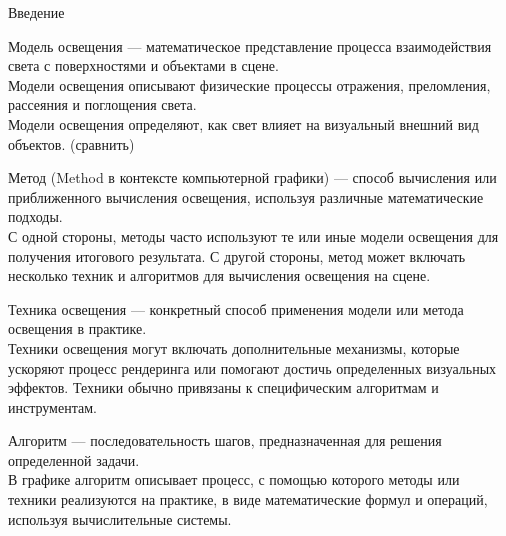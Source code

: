 \documentclass{beamer}
\begin{document}
	\begin{frame}{Введение}
	
		Модель освещения --- математическое представление процесса взаимодействия света с поверхностями и объектами в сцене.\\
		{\footnotesize
		Модели освещения описывают физические процессы отражения, преломления, рассеяния и поглощения света.\\
		Модели освещения определяют, как свет влияет на визуальный внешний вид объектов. (сравнить)
		}

		\vspace{0.15cm}

		Метод (Method в контексте компьютерной графики) --- способ вычисления или приближенного вычисления освещения, используя различные математические подходы.\\
		{\footnotesize
		С одной стороны, методы часто используют те или иные модели освещения для получения итогового результата. 
		С другой стороны, метод может включать несколько техник и алгоритмов для вычисления освещения на сцене.
		}
		
		\vspace{0.15cm}
		Техника освещения --- конкретный способ применения модели или метода освещения в практике. \\
		{\footnotesize
		Техники освещения могут включать дополнительные механизмы, которые ускоряют процесс рендеринга или помогают достичь определенных визуальных эффектов. 
		Техники обычно привязаны к специфическим алгоритмам и инструментам.
		}
		
		\vspace{0.15cm}

		Алгоритм --- последовательность шагов, предназначенная для решения определенной задачи.
		\\
		{\footnotesize
		В графике алгоритм описывает процесс, с помощью которого методы или техники реализуются на практике, в виде математические формул и операций, используя вычислительные системы.
		}

		\note{
		}
		
	\end{frame}
	\fi
\end{document}
